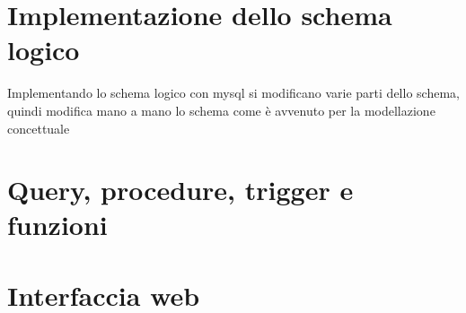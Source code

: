 \documentclass[a4paper,twoside]{article}
\begin{document}
\section{Implementazione dello schema logico}
Implementando lo schema logico con mysql si modificano varie parti dello schema, quindi modifica mano a mano lo schema come è avvenuto per la modellazione concettuale

\section{Query, procedure, trigger e funzioni}

\section{Interfaccia web}
\end{document}
